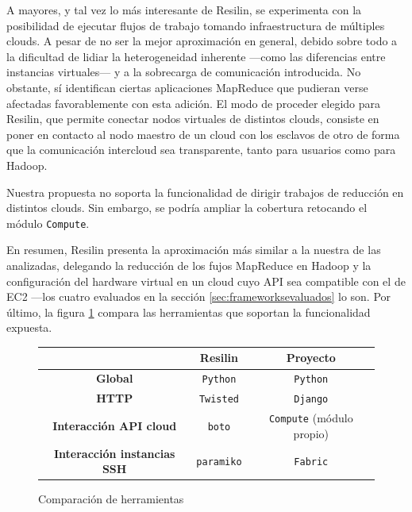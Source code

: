 A mayores, y tal vez lo m\'as interesante de Resilin, se experimenta con la posibilidad de ejecutar flujos de trabajo tomando infraestructura de m\'ultiples clouds. A pesar de no ser la mejor aproximaci\'on en general, debido sobre todo a la dificultad de lidiar la heterogeneidad inherente ---como las diferencias entre instancias virtuales--- y a la sobrecarga de comunicaci\'on introducida. No obstante, s\'i identifican ciertas aplicaciones MapReduce que pudieran verse afectadas favorablemente con esta adici\'on. El modo de proceder elegido para Resilin, que permite conectar nodos virtuales de distintos clouds, consiste en poner en contacto al nodo maestro de un cloud con los esclavos de otro de forma que la comunicaci\'on intercloud sea transparente, tanto para usuarios como para Hadoop.\newline

Nuestra propuesta no soporta la funcionalidad de dirigir trabajos de reducci\'on en distintos clouds. Sin embargo, se podr\'ia ampliar la cobertura retocando el m\'odulo \texttt{Compute}.\newline

En resumen, Resilin presenta la aproximaci\'on m\'as similar a la nuestra de las analizadas, delegando la reducci\'on de los fujos MapReduce en Hadoop y la configuraci\'on del hardware virtual en un cloud cuyo API sea compatible con el de EC2 ---los cuatro evaluados en la secci\'on \ref{sec:frameworksevaluados} lo son. Por \'ultimo, la figura \ref{fig:resilinproyecto} compara las herramientas que soportan la funcionalidad expuesta.

\begin{figure}[tbp]
\begin{center}
\begin{tabular}{|c|c|c|}
\hline
& \textbf{Resilin} & \textbf{Proyecto} \\
\hline
\textbf{Global} & \texttt{Python} & \texttt{Python} \\
\hline
\textbf{HTTP} & \texttt{Twisted} & \texttt{Django} \\
\hline
\textbf{Interacci\'on API cloud} & \texttt{boto} & \texttt{Compute} (m\'odulo propio) \\
\hline
\textbf{Interacci\'on instancias SSH} & \texttt{paramiko} & \texttt{Fabric} \\
\hline
\end{tabular}
\caption{Comparaci\'on de herramientas}
\label{fig:resilinproyecto}
\end{center}
\end{figure}



